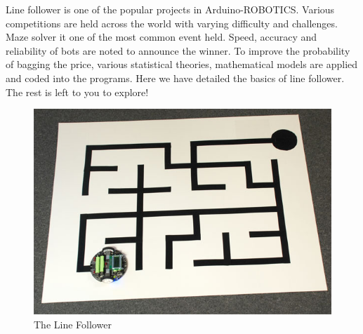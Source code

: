Line follower is one of the popular projects in Arduino-ROBOTICS. Various competitions are held across the world with varying difficulty and challenges. Maze solver it one of the most common event held. Speed, accuracy and reliability of bots are noted to announce the winner. To improve the probability of bagging the price, various statistical theories, mathematical models are applied and coded into the programs. Here we have detailed the basics of line follower. The rest is left to you to explore!
\vspace{0.5cm}
\begin{figure}
    \centering
    \includegraphics{Chapters/images/IR_end_pic.png}
    \caption{The Line Follower}
\end{figure}
